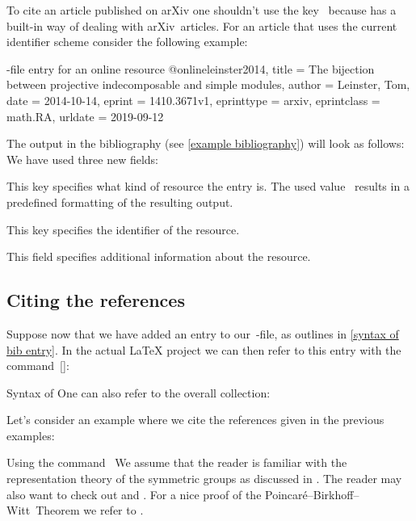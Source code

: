 To cite an article published on arXiv one shouldn’t use the key~ because  has a built-in way of dealing with arXiv~articles.
For an article that uses the current identifier scheme consider the following example:
\begin{showcode}{-file entry for an online resource}
@online{leinster2014,
  title       = {The bijection between projective indecomposable and simple modules},
  author      = {Leinster, Tom},
  date        = {2014-10-14},
  eprint      = {1410.3671v1},
  eprinttype  = {arxiv},
  eprintclass = {math.RA},
  urldate     = {2019-09-12}
}
\end{showcode}
The output in the bibliography (see \cref{example bibliography}) will look as follows:
We have used three new fields:
\begin{mydescription}
  \item[\optname{eprinttype}]
    This key specifies what kind of resource the entry is.
    The used value~ results in a predefined formatting of the resulting output.
  \item[\optname{eprint}]
    This key specifies the identifier of the resource.
  \item[\optname{eprintclass}]
    This field specifies additional information about the resource.
\end{mydescription}





\subsection{Citing the references}

Suppose now that we have added an entry to our~-file, as outlines in \cref{syntax of bib entry}.
In the actual {\LaTeX} project we can then refer to this entry with the command~[\comname]:
\begin{showcode}{Syntax of }
\cite[details]{label}
One can also refer to the overall collection:
\end{showcode}
Let’s consider an example where we cite the references given in the previous examples:
\begin{showlatex}[label = {using cite}]{Using the command~}
We assume that the reader is familiar with the representation theory of the symmetric groups as discussed in \cite[\S 4]{fultonharris2004}.
The reader may also want to check out \cite{benson1991} and \cite{cayley_graph}.
For a nice proof of the Poincaré--Birkhoff--Witt~Theorem we refer to \cite[\S 3]{diamond_lemma}.
\end{showlatex}

